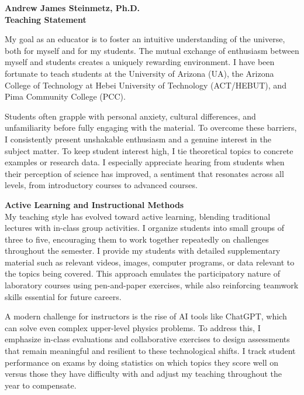 \documentclass[11pt]{article}
\begin{document}
\newpage

\begin{center}
    {\Large\textbf{Andrew James Steinmetz, Ph.D.}}\\[0.5em]
    {\large\textbf{Teaching Statement}}
\end{center}

\noindent
My goal as an educator is to foster an intuitive understanding of the universe, both for myself and for my students. The mutual exchange of enthusiasm between myself and students creates a uniquely rewarding environment. I have been fortunate to teach students at the University of Arizona (UA), the Arizona College of Technology at Hebei University of Technology (ACT/HEBUT), and Pima Community College (PCC).

Students often grapple with personal anxiety, cultural differences, and unfamiliarity before fully engaging with the material. To overcome these barriers, I consistently present unshakable enthusiasm and a genuine interest in the subject matter. To keep student interest high, I tie theoretical topics to concrete examples or research data. I especially appreciate hearing from students when their perception of science has improved, a sentiment that resonates across all levels, from introductory courses to advanced courses.

\vspace{1em}

{\noindent\Large\textbf{Active Learning and Instructional Methods}}\\
My teaching style has evolved toward active learning, blending traditional lectures with in-class group activities. I organize students into small groups of three to five, encouraging them to work together repeatedly on challenges throughout the semester. I provide my students with detailed supplementary material such as relevant videos, images, computer programs, or data relevant to the topics being covered. This approach emulates the participatory nature of laboratory courses using pen-and-paper exercises, while also reinforcing teamwork skills essential for future careers. 

A modern challenge for instructors is the rise of AI tools like ChatGPT, which can solve even complex upper-level physics problems. To address this, I emphasize in-class evaluations and collaborative exercises to design assessments that remain meaningful and resilient to these technological shifts. I track student performance on exams by doing statistics on which topics they score well on versus those they have difficulty with and adjust my teaching throughout the year to compensate.
\end{document}
